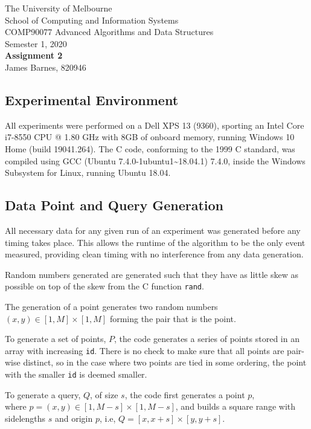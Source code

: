 \documentclass[12pt]{article}
\begin{document}
\begin{center}
  {\sc The University of Melbourne \\
  School of Computing and Information Systems \\ 
  COMP90077 Advanced Algorithms and Data Structures \\
  Semester 1, 2020}
  \bigskip \\
  {\Large\bf Assignment 2}
  \bigskip \\
  {\large James Barnes, 820946}
\end{center}

\subsection*{Experimental Environment}
All experiments were performed on a Dell XPS 13 (9360), sporting an Intel Core i7-8550 CPU @ 1.80 GHz with 8GB of onboard memory, running Windows 10 Home (build 19041.264). The C code, conforming to the 1999 C standard, was compiled using GCC (Ubuntu 7.4.0-1ubuntu1\~{}18.04.1) 7.4.0, inside the Windows Subsystem for Linux, running Ubuntu 18.04.

\subsection*{Data Point and Query Generation}
All necessary data for any given run of an experiment was generated before any timing takes place. This allows the runtime of the algorithm to be the only event measured, providing clean timing with no interference from any data generation.

Random numbers generated are generated such that they have as little skew as possible on top of the skew from the C function \texttt{rand}. 

The generation of a point generates two random numbers $\left( x, y \right) \in [1, M] \times [1, M]$ forming the pair that is the point. 

To generate a set of points, $P$, the code generates a series of points stored in an array with increasing \texttt{id}. There is no check to make sure that all points are pair-wise distinct, so in the case where two points are tied in some ordering, the point with the smaller \texttt{id} is deemed smaller.

To generate a query, $Q$, of size $s$, the code first generates a point $p$, \\
where $p = \left( x, y \right) \in [1, M - s] \times [1, M - s]$, and builds a square range with sidelengths $s$ and origin $p$, i.e, $Q = [x, x + s] \times [y, y + s]$.
\end{document}
